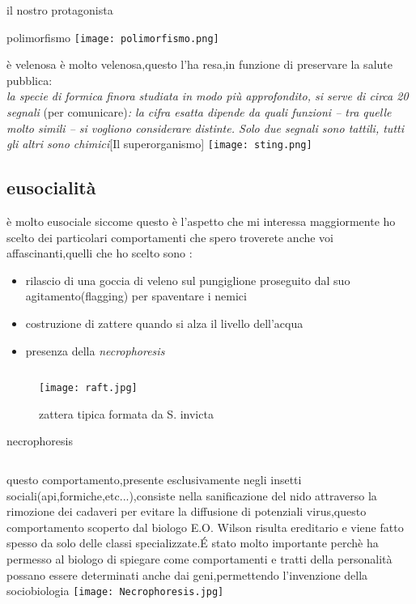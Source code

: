 \documentclass{beamer}
\begin{document}
\begin{section}{il nostro protagonista}
\begin{frame}{polimorfismo}
\texttt{[image: polimorfismo.png]}
\end{frame}
\begin{frame}{è velenosa}
    è molto velenosa,questo l'ha resa,in funzione di preservare la salute pubblica: \\ \textit{\alert{la specie di formica finora studiata in modo più approfondito}, si serve di circa \alert{20 segnali} }(per comunicare)\textit{: la cifra esatta dipende da quali funzioni – tra quelle molto simili – si vogliono considerare distinte. \alert{Solo due segnali sono tattili, tutti gli altri sono chimici}}[Il superorganismo]
    \texttt{[image: sting.png]}
\end{frame}
\subsection{eusocialità}
\begin{frame}{è molto eusociale}
    siccome questo è l'aspetto che mi interessa maggiormente ho scelto dei particolari comportamenti che spero troverete anche voi affascinanti,quelli che ho scelto sono :
    \begin{itemize}[label=]
        \item rilascio di una goccia di veleno sul pungiglione proseguito dal suo agitamento(flagging) per spaventare i nemici
        \item costruzione di zattere quando si alza il livello dell'acqua
        \item presenza della \textit{necrophoresis}
    \end{itemize}
     \begin{figure}
      \begin{columns}
        \texttt{[image: raft.jpg]}
        \caption{ zattera tipica formata da S. invicta }
      \end{columns}
    \end{figure}
\end{frame}
\begin{frame}{necrophoresis}
\begin{columns}
    \centering
     questo comportamento,\alert{presente esclusivamente negli insetti sociali}(api,formiche,etc...),consiste nella sanificazione del nido attraverso la \alert{rimozione dei cadaveri} per evitare la diffusione di potenziali virus,questo comportamento scoperto dal biologo E.O. Wilson risulta ereditario e viene \alert{fatto spesso da solo delle classi specializzate}.É stato molto importante perchè ha permesso al biologo di spiegare come \alert{comportamenti e tratti della personalità possano essere determinati anche dai geni},permettendo l'invenzione della sociobiologia
    \texttt{[image: Necrophoresis.jpg]}
\end{columns}

\end{frame}
\end{section}
\end{document}
